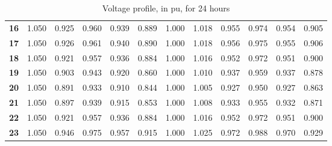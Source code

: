 \begin{table}[!htb]
\begin{tabular}{|c|ccccccccccc|}
\textbf{16} & 1.050 & 0.925 & 0.960 & 0.939 & 0.889 & 1.000 & 1.018 & 0.955 & 0.974 & 0.954 & 0.905 \\
\textbf{17} & 1.050 & 0.926 & 0.961 & 0.940 & 0.890 & 1.000 & 1.018 & 0.956 & 0.975 & 0.955 & 0.906 \\
\textbf{18} & 1.050 & 0.921 & 0.957 & 0.936 & 0.884 & 1.000 & 1.016 & 0.952 & 0.972 & 0.951 & 0.900 \\
\textbf{19} & 1.050 & 0.903 & 0.943 & 0.920 & 0.860 & 1.000 & 1.010 & 0.937 & 0.959 & 0.937 & 0.878 \\
\textbf{20} & 1.050 & 0.891 & 0.933 & 0.910 & 0.844 & 1.000 & 1.005 & 0.927 & 0.950 & 0.927 & 0.863 \\
\textbf{21} & 1.050 & 0.897 & 0.939 & 0.915 & 0.853 & 1.000 & 1.008 & 0.933 & 0.955 & 0.932 & 0.871 \\
\textbf{22} & 1.050 & 0.921 & 0.957 & 0.936 & 0.884 & 1.000 & 1.016 & 0.952 & 0.972 & 0.951 & 0.900 \\
\textbf{23} & 1.050 & 0.946 & 0.975 & 0.957 & 0.915 & 1.000 & 1.025 & 0.972 & 0.988 & 0.970 & 0.929 \\
\hline
    \end{tabular}
    \caption{Voltage profile, in pu, for 24 hours}
    \label{tab:volt1}
\end{table}



